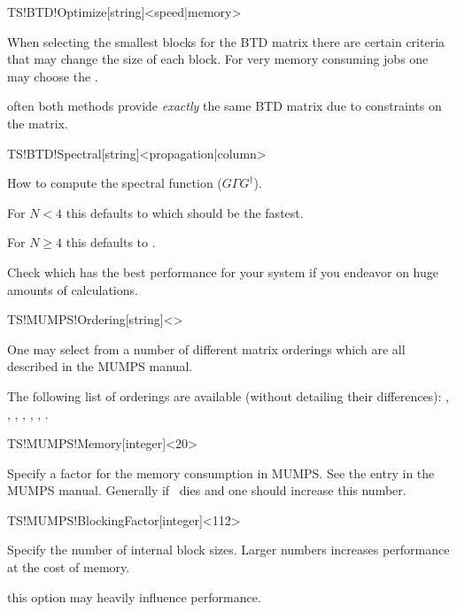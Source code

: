 \begin{fdfentry}{TS!BTD!Optimize}[string]<speed|memory>

  When selecting the smallest blocks for the BTD matrix there are
  certain criteria that may change the size of each block. For very
  memory consuming jobs one may choose the . 

  \note often both methods provide \emph{exactly} the same BTD matrix
  due to constraints on the matrix.
  
\end{fdfentry}

\begin{fdfentry}{TS!BTD!Spectral}[string]<propagation|column>

  How to compute the spectral function ($G\Gamma G^\dagger$). 

  For $N<4$ this defaults to  which should be the
  fastest.

  For $N\ge4$ this defaults to .

  Check which has the best performance for your system if you endeavor
  on huge amounts of calculations.

\end{fdfentry}


\begin{fdfentry}{TS!MUMPS!Ordering}[string]<>

  One may select from a number of different matrix orderings which are
  all described in the MUMPS manual. 

  The following list of orderings are available (without detailing
  their differences): %
  , , , , ,
  , .
  
\end{fdfentry}

\begin{fdfentry}{TS!MUMPS!Memory}[integer]<20>

  Specify a factor for the memory consumption in MUMPS. See the
   entry in the MUMPS manual. Generally if \tsiesta\
  dies and  one should increase this number.
  
\end{fdfentry}

\begin{fdfentry}{TS!MUMPS!BlockingFactor}[integer]<112>

  Specify the number of internal block sizes. Larger numbers increases
  performance at the cost of memory.
  
  \note this option may heavily influence performance.

\end{fdfentry}

